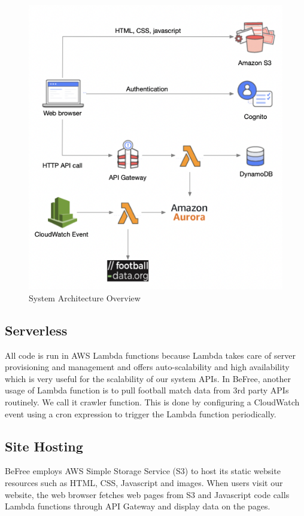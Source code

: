 \documentclass[conference]{IEEEtran}
\begin{document}
\begin{figure}[htbp]
\centerline{\includegraphics{architecture.png}}
\caption{System Architecture Overview}
\label{architecture}
\end{figure}

\subsection{Serverless}
All code is run in AWS Lambda \cite{b4} functions because Lambda takes care of server provisioning and management and offers auto-scalability and high availability which is very useful for the scalability of our system APIs. In BeFree, another usage of Lambda function is to pull football match data from 3rd party APIs routinely. We call it crawler function. This is done by configuring a CloudWatch \cite{b5} event using a cron expression to trigger the Lambda function periodically.

\subsection{Site Hosting}
BeFree employs AWS Simple Storage Service (S3) \cite{b6} to host its static website resources such as HTML, CSS, Javascript and images. When users visit our website, the web browser fetches web pages from S3 and Javascript code calls Lambda functions through API Gateway \cite{b7} and display data on the pages.
\end{document}
